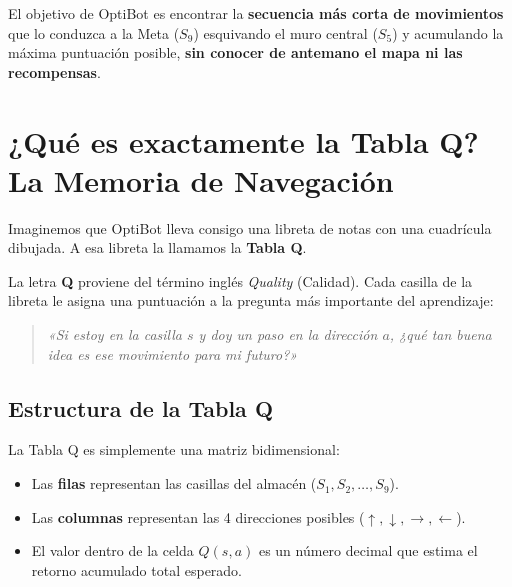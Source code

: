 \begin{ideaclave}
El objetivo de OptiBot es encontrar la \textbf{secuencia más corta de movimientos} que lo conduzca a la Meta ($S_9$) esquivando el muro central ($S_5$) y acumulando la máxima puntuación posible, \textbf{sin conocer de antemano el mapa ni las recompensas}.
\end{ideaclave}

\section{¿Qué es exactamente la Tabla Q? La Memoria de Navegación}
Imaginemos que OptiBot lleva consigo una libreta de notas con una cuadrícula dibujada. A esa libreta la llamamos la \textbf{Tabla Q}.

La letra \textbf{Q} proviene del término inglés \textit{Quality} (Calidad). Cada casilla de la libreta le asigna una puntuación a la pregunta más importante del aprendizaje:
\begin{quote}
  \textit{«Si estoy en la casilla $s$ y doy un paso en la dirección $a$, ¿qué tan buena idea es ese movimiento para mi futuro?»}
\end{quote}

\subsection{Estructura de la Tabla Q}
La Tabla Q es simplemente una matriz bidimensional:
\begin{itemize}
  \item Las \textbf{filas} representan las casillas del almacén ($S_1, S_2, \dots, S_9$).
  \item Las \textbf{columnas} representan las 4 direcciones posibles ($\uparrow, \downarrow, \rightarrow, \leftarrow$).
  \item El valor dentro de la celda $Q(s, a)$ es un número decimal que estima el retorno acumulado total esperado.
\end{itemize}

